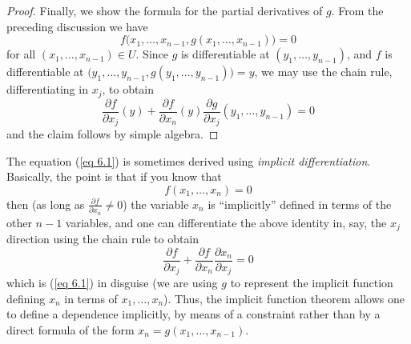 \begin{proof}
    Finally, we show the formula for the partial derivatives of \(g\).
    From the preceding discussion we have
    \[
        f\big(x_1, \dots, x_{n - 1}, g(x_1, \dots, x_{n - 1})\big) = 0
    \]
    for all \((x_1, \dots, x_{n - 1}) \in U\).
    Since \(g\) is differentiable at \((y_1, \dots, y_{n - 1})\), and \(f\) is differentiable at \(\big(y_1, \dots, y_{n - 1}, g(y_1, \dots, y_{n - 1})\big) = y\), we may use the chain rule, differentiating in \(x_j\), to obtain
    \[
        \frac{\partial f}{\partial x_j}(y) + \frac{\partial f}{\partial x_n}(y) \frac{\partial g}{\partial x_j}(y_1, \dots, y_{n - 1}) = 0
    \]
    and the claim follows by simple algebra.
\end{proof}

\begin{remark}\label{6.8.2}
    The equation (\ref{eq 6.1}) is sometimes derived using \emph{implicit differentiation}.
    Basically, the point is that if you know that
    \[
        f(x_1, \dots, x_n) = 0
    \]
    then (as long as \(\frac{\partial f}{\partial x_n} \neq 0\)) the variable \(x_n\) is ``implicitly'' defined in terms of the other \(n - 1\) variables, and one can differentiate the above identity in, say, the \(x_j\) direction using the chain rule to obtain
    \[
        \frac{\partial f}{\partial x_j} + \frac{\partial f}{\partial x_n} \frac{\partial x_n}{\partial x_j} = 0
    \]
    which is (\ref{eq 6.1}) in disguise
    (we are using \(g\) to represent the implicit function defining \(x_n\) in terms of \(x_1, \dots, x_n\)).
    Thus, the implicit function theorem allows one to define a dependence implicitly, by means of a constraint rather than by a direct formula of the form \(x_n = g(x_1, \dots, x_{n - 1})\).
\end{remark}


